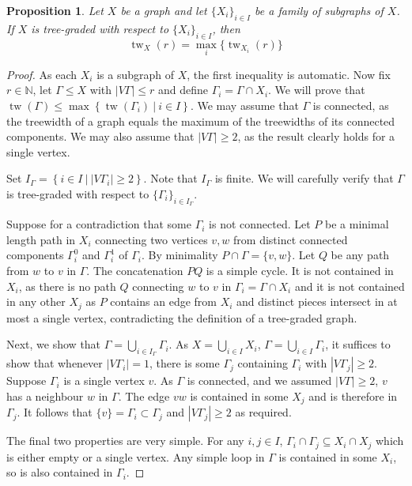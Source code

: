\documentclass{article}
\numberwithin{equation}{section}
\newtheorem{proposition}[equation]{Proposition}
\theoremstyle{definition}
\theoremstyle{citing}
\DeclareMathOperator{\tw}{tw}
\newcommand{\setcon}[2]{\left\{#1\ \left|\ #2\right.\right\}}
\newcommand{\N}{\mathbb{N}}
\numberwithin{equation}{section}
\begin{document}
\begin{proposition} Let $X$ be a graph and let $\{X_i\}_{i\in I}$ be a family of subgraphs of $X$. If $X$ is tree-graded with respect to $\{X_i\}_{i\in I}$, then
\[
    \tw_X(r)=\max_i \{\tw_{X_i}(r)\}
\]
\end{proposition}
\begin{proof}
    As each $X_i$ is a subgraph of $X$, the first inequality is automatic. Now fix $r\in \N$, let $\Gamma\leq X$ with $|V\Gamma|\leq r$ and define $\Gamma_i=\Gamma\cap X_i$. We will prove that $\tw(\Gamma)\leq\max\setcon{\tw(\Gamma_i)}{i\in I}$. 
    We may assume that $\Gamma$ is connected, as the treewidth of a graph equals the maximum of the treewidths of its connected components. We may also assume that $|V\Gamma|\geq 2$, as the result clearly holds for a single vertex.

    Set $I_\Gamma= \setcon{i\in I}{|V\Gamma_i|\geq 2}$. Note that $I_\Gamma$ is finite. We will carefully verify that $\Gamma$ is tree-graded with respect to $\{\Gamma_i\}_{i\in I_\Gamma}$. 

    Suppose for a contradiction that some $\Gamma_i$ is not connected. Let $P$ be a minimal length path in $X_i$ connecting two vertices $v,w$ from distinct connected components $\Gamma^0_i$ and $\Gamma^1_i$ of $\Gamma_i$. By minimality $P\cap \Gamma=\{v,w\}$. Let $Q$ be any path from $w$ to $v$ in $\Gamma$. The concatenation $PQ$ is a simple cycle. It is not contained in $X_i$, as there is no path $Q$ connecting $w$ to $v$ in $\Gamma_i=\Gamma\cap X_i$ and it is not contained in any other $X_j$ as $P$ contains an edge from $X_i$ and distinct pieces intersect in at most a single vertex, contradicting the definition of a tree-graded graph.

    Next, we show that $\Gamma=\bigcup_{i\in I_\Gamma} \Gamma_i$. As $X=\bigcup_{i\in I} X_i$, $\Gamma=\bigcup_{i\in I} \Gamma_i$, it suffices to show that whenever $|V\Gamma_i|=1$, there is some $\Gamma_j$ containing $\Gamma_i$ with $|V\Gamma_j|\geq 2$. Suppose $\Gamma_i$ is a single vertex $v$. As $\Gamma$ is connected, and we assumed $|V\Gamma|\geq 2$, $v$ has a neighbour $w$ in $\Gamma$. The edge $vw$ is contained in some $X_j$ and is therefore in $\Gamma_j$. It follows that $\{v\}=\Gamma_i\subset \Gamma_j$ and $|V\Gamma_j|\geq 2$ as required.

    The final two properties are very simple. For any $i,j\in I$, $\Gamma_i\cap\Gamma_j\subseteq X_i\cap X_j$ which is either empty or a single vertex. Any simple loop in $\Gamma$ is contained in some $X_i$, so is also contained in $\Gamma_i$.


\end{proof}
\end{document}
